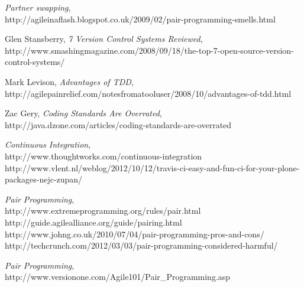 \documentclass[10pt, a4paper]{article}
\begin{document}
\begin{thebibliography}{9}

  \emph{Partner swapping},
  \\http://agileinaflash.blogspot.co.uk/2009/02/pair-programming-smells.html

  Glen Stansberry,
  \emph{7 Version Control Systems Reviewed},
  \\http://www.smashingmagazine.com/2008/09/18/the-top-7-open-source-version-control-systems/
  
  Mark Levison,
  \emph{Advantages of TDD},
  \\http://agilepainrelief.com/notesfromatooluser/2008/10/advantages-of-tdd.html
  
  Zac Gery,
  \emph{Coding Standards Are Overrated},
  \\http://java.dzone.com/articles/coding-standards-are-overrated

  \emph{Continuous Integration},
  \\http://www.thoughtworks.com/continuous-integration
  \\http://www.vlent.nl/weblog/2012/10/12/travis-ci-easy-and-fun-ci-for-your-plone-packages-nejc-zupan/ 

  \emph{Pair Programming},
  \\http://www.extremeprogramming.org/rules/pair.html
  \\http://guide.agilealliance.org/guide/pairing.html
  \\http://www.johng.co.uk/2010/07/04/pair-programming-pros-and-cons/
  \\http://techcrunch.com/2012/03/03/pair-programming-considered-harmful/ 

  \emph{Pair Programming},
  \\http://www.versionone.com/Agile101/Pair{\_}Programming.asp

\end{thebibliography}
\end{document}
